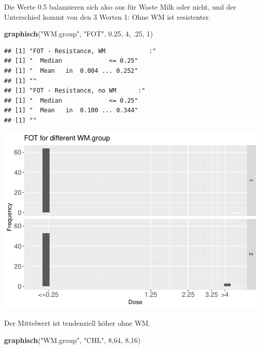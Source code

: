 \documentclass[
]{article}
\newenvironment{Shaded}{\begin{snugshade}}{\end{snugshade}}
\newcommand{\DecValTok}[1]{\textcolor[rgb]{0.00,0.00,0.81}{#1}}
\newcommand{\FloatTok}[1]{\textcolor[rgb]{0.00,0.00,0.81}{#1}}
\newcommand{\KeywordTok}[1]{\textcolor[rgb]{0.13,0.29,0.53}{\textbf{#1}}}
\newcommand{\NormalTok}[1]{#1}
\newcommand{\StringTok}[1]{\textcolor[rgb]{0.31,0.60,0.02}{#1}}
\begin{document}
Die Werte 0.5 balanzieren sich also aus für Waste Milk oder nicht, und
der Unterschied kommt von den 3 Werten 1: Ohne WM ist resistenter.

\begin{Shaded}
\begin{Highlighting}[]
  \KeywordTok{graphisch}\NormalTok{(}\StringTok{"WM.group"}\NormalTok{, }\StringTok{"FOT"}\NormalTok{, }\FloatTok{0.25}\NormalTok{,  }\DecValTok{4}\NormalTok{, }\FloatTok{.25}\NormalTok{, }\DecValTok{1}\NormalTok{)  }
\end{Highlighting}
\end{Shaded}

\begin{verbatim}
## [1] "FOT - Resistance, WM            :"
## [1] "  Median             <= 0.25"
## [1] "  Mean   in  0.004 ... 0.252"
## [1] ""
## [1] "FOT - Resistance, no WM      :"
## [1] "  Median             <= 0.25"
## [1] "  Mean   in  0.100 ... 0.344"
## [1] ""
\end{verbatim}

\includegraphics{Verteilungen_files/figure-latex/unnamed-chunk-38-1.pdf}

Der Mittelwert ist tendenziell höher ohne WM.

\begin{Shaded}
\begin{Highlighting}[]
  \KeywordTok{graphisch}\NormalTok{(}\StringTok{"WM.group"}\NormalTok{, }\StringTok{"CHL"}\NormalTok{, }\DecValTok{8}\NormalTok{,}\DecValTok{64}\NormalTok{, }\DecValTok{8}\NormalTok{,}\DecValTok{16}\NormalTok{) }
\end{Highlighting}
\end{Shaded}
\end{document}

